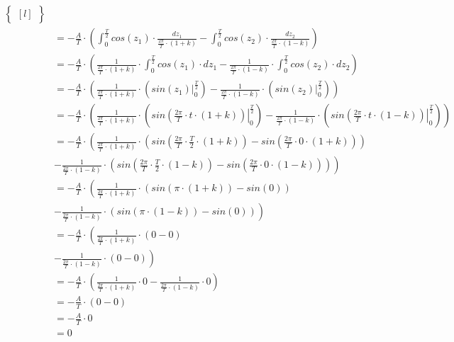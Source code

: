 \begin{align*}
\begin{Bmatrix*}[l]
\end{Bmatrix*}\\
&=-\frac{A}{T} \cdot \left(\int_{0}^{\frac{T}{2}} cos\left( z_1 \right)\cdot \frac{dz_1}{\frac{2\pi}{T} \cdot \left(1+k\right)}  - \int_{0}^{\frac{T}{2}} cos\left( z_2\right) \cdot \frac{dz_2}{\frac{2\pi}{T} \cdot \left(1-k\right)}\right)\\
&=-\frac{A}{T} \cdot \left(\frac{1}{\frac{2\pi}{T}\cdot \left(1+k\right)} \cdot \int_{0}^{\frac{T}{2}} cos\left( z_1 \right)\cdot dz_1 - \frac{1}{\frac{2\pi}{T} \cdot \left(1-k\right)} \cdot \int_{0}^{\frac{T}{2}} cos\left( z_2\right) \cdot dz_2 \right)\\
&=-\frac{A}{T} \cdot \left(\frac{1}{\frac{2\pi}{T}\cdot \left(1+k\right)} \cdot \left( \left. sin\left( z_1 \right) \right|_{0}^{\frac{T}{2}} \right) - \frac{1}{\frac{2\pi}{T} \cdot \left(1-k\right)} \cdot \left(\left. sin\left( z_2\right) \right|_{0}^{\frac{T}{2}} \right) \right)\\
&=-\frac{A}{T} \cdot \left(\frac{1}{\frac{2\pi}{T}\cdot \left(1+k\right)} \cdot \left( \left. sin\left( \frac{2\pi}{T} \cdot t \cdot \left(1+k\right) \right) \right|_{0}^{\frac{T}{2}} \right) - \frac{1}{\frac{2\pi}{T} \cdot \left(1-k\right)} \cdot \left(\left. sin\left( \frac{2\pi}{T} \cdot t \cdot \left(1-k\right)\right) \right|_{0}^{\frac{T}{2}} \right) \right)\\
&=-\frac{A}{T} \cdot \left(\frac{1}{\frac{2\pi}{T}\cdot \left(1+k\right)} \cdot \left( sin\left( \frac{2\pi}{T} \cdot \frac{T}{2} \cdot \left(1+k\right) \right) - sin\left( \frac{2\pi}{T} \cdot 0 \cdot \left(1+k\right) \right) \right) \right.\\
&\left.- \frac{1}{\frac{2\pi}{T} \cdot \left(1-k\right)} \cdot \left( sin\left( \frac{2\pi}{T} \cdot \frac{T}{2} \cdot \left(1-k\right)\right) -  sin\left( \frac{2\pi}{T} \cdot 0 \cdot \left(1-k\right)\right) \right) \right)\\
&=-\frac{A}{T} \cdot \left(\frac{1}{\frac{2\pi}{T}\cdot \left(1+k\right)} \cdot \left( sin\left(\pi \cdot \left(1+k\right) \right) - sin\left( 0 \right) \right) \right.\\
&\left.- \frac{1}{\frac{2\pi}{T} \cdot \left(1-k\right)} \cdot \left( sin\left(\pi \cdot \left(1-k\right)\right) -  sin\left( 0 \right) \right) \right)\\
&=-\frac{A}{T} \cdot \left(\frac{1}{\frac{2\pi}{T}\cdot \left(1+k\right)} \cdot \left( 0 - 0 \right) \right.\\
&\left.- \frac{1}{\frac{2\pi}{T} \cdot \left(1-k\right)} \cdot \left( 0 -  0 \right) \right)\\
&=-\frac{A}{T} \cdot \left(\frac{1}{\frac{2\pi}{T}\cdot \left(1+k\right)} \cdot 0 - \frac{1}{\frac{2\pi}{T} \cdot \left(1-k\right)} \cdot 0 \right)\\
&=-\frac{A}{T} \cdot \left(0 - 0 \right)\\
&=-\frac{A}{T} \cdot 0\\
&=0
\end{align*}

